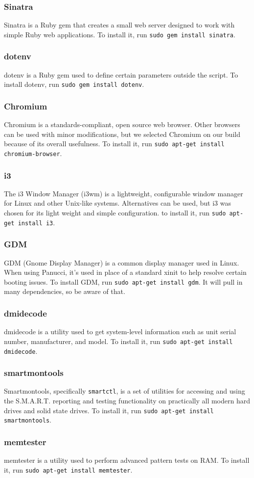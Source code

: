 \documentclass{article}
\def\code#1{\texttt{#1}}
\begin{document}
\begin{flushleft}
\subsubsection{Sinatra}
Sinatra is a Ruby gem that creates a small web server designed to work with simple Ruby web applications.  To install it, run \code{sudo gem install sinatra}.
\subsubsection{dotenv}
dotenv is a Ruby gem used to define certain parameters outside the script.  To install dotenv, run \code{sudo gem install dotenv}.
\subsubsection{Chromium}
Chromium is a standards-compliant, open source web browser.  Other browsers can be used with minor modifications, but we selected Chromium on our build because of its overall usefulness.  To install it, run \code{sudo apt-get install chromium-browser}.
\subsubsection{i3}
The i3 Window Manager (i3wm) is a lightweight, configurable window manager for Linux and other Unix-like systems.  Alternatives can be used, but i3 was chosen for its light weight and simple configuration.  to install it, run \code{sudo apt-get install i3}.
\subsubsection{GDM}
GDM (Gnome Display Manager) is a common display manager used in Linux.  When using Panucci, it's used in place of a standard xinit to help resolve certain booting issues.  To install GDM, run \code{sudo apt-get install gdm}.  It will pull in many dependencies, so be aware of that.
\subsubsection{dmidecode}
dmidecode is a utility used to get system-level information such as unit serial number, manufacturer, and model.  To install it, run \code{sudo apt-get install dmidecode}.
\subsubsection{smartmontools}
Smartmontools, specifically \code{smartctl}, is a set of utilities for accessing and using the S.M.A.R.T. reporting and testing functionality on practically all modern hard drives and solid state drives.  To install it, run \code{sudo apt-get install smartmontools}.
\subsubsection{memtester}
memtester is a utility used to perform advanced pattern tests on RAM.  To install it, run \code{sudo apt-get install memtester}.
\end{flushleft}
\end{document}
